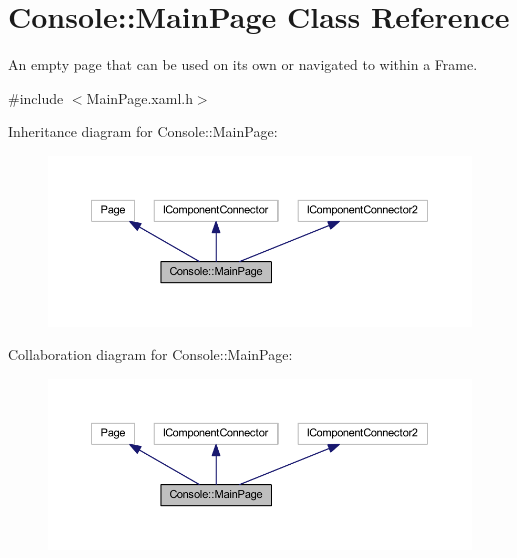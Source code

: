 \hypertarget{class_console_1_1_main_page}{}\section{Console\+:\+:Main\+Page Class Reference}
\label{class_console_1_1_main_page}


An empty page that can be used on its own or navigated to within a Frame.  




{\ttfamily \#include $<$Main\+Page.\+xaml.\+h$>$}



Inheritance diagram for Console\+:\+:Main\+Page\+:\nopagebreak
\begin{figure}[H]
\begin{center}
\leavevmode
\includegraphics[width=350pt]{class_console_1_1_main_page__inherit__graph}
\end{center}
\end{figure}


Collaboration diagram for Console\+:\+:Main\+Page\+:\nopagebreak
\begin{figure}[H]
\begin{center}
\leavevmode
\includegraphics[width=350pt]{class_console_1_1_main_page__coll__graph}
\end{center}
\end{figure}
